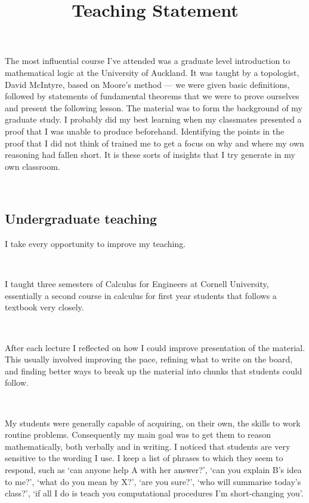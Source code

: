 \documentclass[10,a4paper,sans]{moderncv}
\title{Teaching Statement}
\begin{document}
\makecvtitle

 

The most influential course I've attended was a graduate level introduction to
mathematical logic at the University of Auckland.  It was taught by a topologist, David McIntyre, based on Moore's method --- 
we were given basic definitions, followed by statements of
fundamental theorems that we were to prove ourselves and present the following
lesson. The material was to form the background of my
graduate study. I probably did my best learning when my classmates presented a
proof that I was unable to produce beforehand. Identifying the points in the proof that I
did not think of trained me to get a focus on why and where my own reasoning
had fallen short. It is these sorts of insights that I try generate in my own classroom.

\


\subsection{Undergraduate teaching}

I take every opportunity to improve my teaching.

\

I taught three semesters of Calculus for Engineers at Cornell University, essentially a second course in calculus for first year students that follows a textbook very closely.

\

After each lecture I reflected on how I could improve presentation of the material. This usually involved improving the pace, refining what to write on the board, and finding better ways to break up the material into chunks that students could follow.

\

My students were generally capable of acquiring, on their own, the skills to work routine problems. %
Consequently my main goal 
was to get them to reason mathematically, both verbally and in writing. I noticed that students are very sensitive to the wording I use.
I keep a list of phrases to which they seem to respond, such as  `can anyone help A with her answer?', `can you explain B's idea to me?', `what do you mean by X?',
`are you sure?', `who will summarise today's class?', `if all I do is teach you computational procedures I'm short-changing you'.
\end{document}
